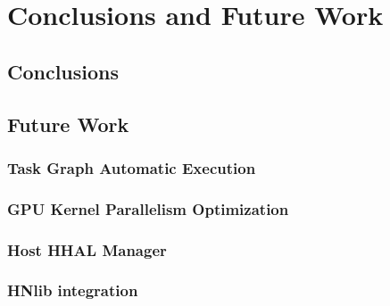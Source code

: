 \chapter{Conclusions and Future Work}

\section{Conclusions}

\section{Future Work}
\subsection{Task Graph Automatic Execution}
\subsection{GPU Kernel Parallelism Optimization}
\subsection{Host HHAL Manager}
\subsection{HNlib integration}


